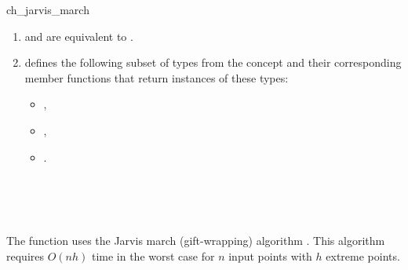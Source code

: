 \begin{ccRefFunction}{ch_jarvis_march}
\begin{enumerate}
   \item    {} and 
            are equivalent to .
   \item    {} defines the following subset of types from
            the concept  and their corresponding member
            functions that return instances of these types:
            \begin{itemize}
                \item {},
		\item {},
                \item {}.
            \end{itemize}
\end{enumerate}

\ccSeeAlso

 \\
 \\
 \\


\ccImplementation

The function uses the Jarvis march (gift-wrapping)
algorithm \cite{j-ichfs-73}. This algorithm requires $O(n h)$ time 
in the worst case for $n$ input points with $h$ extreme points.  
\end{ccRefFunction}



